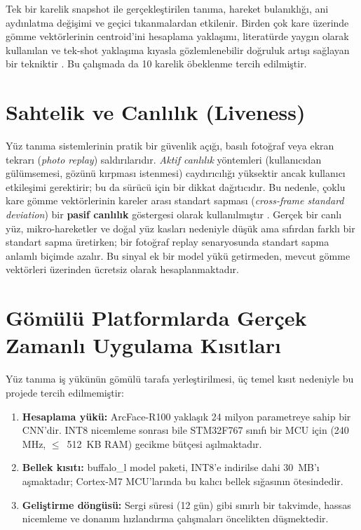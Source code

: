 Tek bir karelik snapshot ile gerçekleştirilen tanıma, hareket bulanıklığı,
ani aydınlatma değişimi ve geçici tıkanmalardan etkilenir. Birden çok
kare üzerinde gömme vektörlerinin centroid'ini hesaplama yaklaşımı,
literatürde yaygın olarak kullanılan ve tek-shot yaklaşıma kıyasla
gözlemlenebilir doğruluk artışı sağlayan bir tekniktir
\cite{chen2018multiframe}. Bu çalışmada da 10 karelik öbeklenme tercih
edilmiştir.

\section{Sahtelik ve Canlılık (Liveness)}

Yüz tanıma sistemlerinin pratik bir güvenlik açığı, basılı fotoğraf veya
ekran tekrarı (\emph{photo replay}) saldırılarıdır. \emph{Aktif canlılık}
yöntemleri (kullanıcıdan gülümsemesi, gözünü kırpması istenmesi)
caydırıcılığı yüksektir ancak kullanıcı etkileşimi gerektirir; bu da
sürücü için bir dikkat dağıtıcıdır. Bu nedenle, çoklu kare gömme
vektörlerinin kareler arası standart sapması (\emph{cross-frame standard
deviation}) bir \textbf{pasif canlılık} göstergesi olarak kullanılmıştır
\cite{tang2018liveness}. Gerçek bir canlı yüz, mikro-hareketler ve doğal
yüz kasları nedeniyle düşük ama sıfırdan farklı bir standart sapma
üretirken; bir fotoğraf replay senaryosunda standart sapma anlamlı
biçimde azalır. Bu sinyal ek bir model yükü getirmeden, mevcut gömme
vektörleri üzerinden ücretsiz olarak hesaplanmaktadır.

\section{Gömülü Platformlarda Gerçek Zamanlı Uygulama Kısıtları}

Yüz tanıma iş yükünün gömülü tarafa yerleştirilmesi, üç temel kısıt
nedeniyle bu projede tercih edilmemiştir:

\begin{enumerate}
    \item \textbf{Hesaplama yükü:} ArcFace-R100 yaklaşık 24 milyon
          parametreye sahip bir CNN'dir. INT8 nicemleme sonrası bile
          STM32F767 sınıfı bir MCU için (240 MHz, $\leq$~512~KB RAM)
          gecikme bütçesi aşılmaktadır.
    \item \textbf{Bellek kısıtı:} buffalo\_l model paketi, INT8'e
          indirilse dahi 30~MB'ı aşmaktadır; Cortex-M7 MCU'larında
          bu kalıcı bellek sığasının ötesindedir.
    \item \textbf{Geliştirme döngüsü:} Sergi süresi (12 gün) gibi sınırlı
          bir takvimde, hassas nicemleme ve donanım hızlandırma
          çalışmaları öncelikten düşmektedir.
\end{enumerate}

